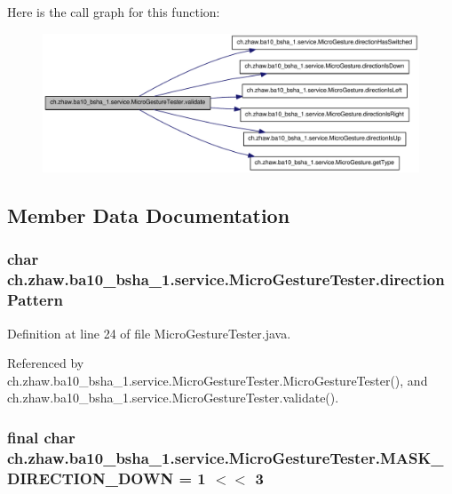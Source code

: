 Here is the call graph for this function:\nopagebreak
\begin{figure}[H]
\begin{center}
\leavevmode
\includegraphics[width=330pt]{classch_1_1zhaw_1_1ba10__bsha__1_1_1service_1_1MicroGestureTester_a0ec321204f2eb55d1fa0ce77a6df4654_cgraph}
\end{center}
\end{figure}


\subsection{Member Data Documentation}
\hypertarget{classch_1_1zhaw_1_1ba10__bsha__1_1_1service_1_1MicroGestureTester_a9c587f2d873a013f9ff1c1e053181fbb}{
\subsubsection[{directionPattern}]{\setlength{\rightskip}{0pt plus 5cm}char {\bf ch.zhaw.ba10\_\-bsha\_\-1.service.MicroGestureTester.directionPattern}}}
\label{classch_1_1zhaw_1_1ba10__bsha__1_1_1service_1_1MicroGestureTester_a9c587f2d873a013f9ff1c1e053181fbb}


Definition at line 24 of file MicroGestureTester.java.

Referenced by ch.zhaw.ba10\_\-bsha\_\-1.service.MicroGestureTester.MicroGestureTester(), and ch.zhaw.ba10\_\-bsha\_\-1.service.MicroGestureTester.validate().\hypertarget{classch_1_1zhaw_1_1ba10__bsha__1_1_1service_1_1MicroGestureTester_ab7e85bde474db08a040451c33b4b6885}{
\subsubsection[{MASK\_\-DIRECTION\_\-DOWN}]{\setlength{\rightskip}{0pt plus 5cm}final char {\bf ch.zhaw.ba10\_\-bsha\_\-1.service.MicroGestureTester.MASK\_\-DIRECTION\_\-DOWN} = 1 $<$$<$ 3}}
\label{classch_1_1zhaw_1_1ba10__bsha__1_1_1service_1_1MicroGestureTester_ab7e85bde474db08a040451c33b4b6885}


